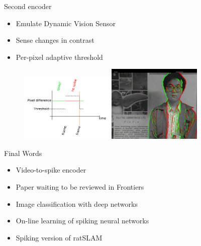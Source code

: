 \documentclass[17pt,mathserif]{beamer}
\begin{document}
    \begin{frame}{Second encoder}
      \vspace*{-2em}
      \begin{itemize}
        \item Emulate Dynamic Vision Sensor 
        \item Sense changes in contrast
        \item Per-pixel adaptive threshold
      \end{itemize}
      \vspace*{-1em}
      \begin{figure}
        \includegraphics[width=0.4\textwidth]{DVSemu} 
        \hspace*{0.1em}
        \includegraphics[width=0.4\textwidth]{dvs-emu-img}
      \end{figure}
    \end{frame}


    \begin{frame}{Final Words}
        \vspace*{-3em}
        \begin{itemize}
          \item[$\checkmark$] Video-to-spike encoder
          \item[$\checkmark$] Paper waiting to be reviewed in Frontiers
          \item[{\footnotesize [\textsc{to do}]}] Image classification with deep networks
          \item[{\footnotesize [\textsc{to do}]}] On-line learning of spiking neural networks
          \item[{\footnotesize [\textsc{to do}]}] Spiking version of ratSLAM
        \end{itemize}
    \end{frame}
\end{document}
